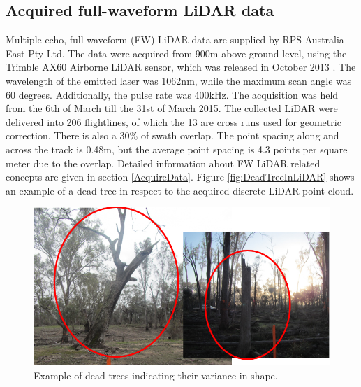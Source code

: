 \documentclass{subfiles}
\begin{document}
\subsection{Acquired full-waveform LiDAR data}

\par Multiple-echo, full-waveform (FW) LiDAR data are supplied by RPS Australia East Pty Ltd. The data were acquired from 900m above ground level, using the Trimble AX60 Airborne LiDAR sensor, which was released in October 2013 \cite{Trimble}. The wavelength of the emitted laser was 1062nm, while the maximum scan angle was 60 degrees. Additionally, the pulse rate was 400kHz. The acquisition was held from the 6th of March till the 31st of March 2015.  The collected LiDAR were delivered into 206 flightlines, of which the 13 are cross runs used for geometric correction. There is also a 30\% of swath overlap. The point spacing along and across the track  is 0.48m, but the average point spacing is 4.3 points per square meter due to the overlap. Detailed information about FW LiDAR related concepts are given in section \ref{AcquireData}. Figure \ref{fig:DeadTreeInLiDAR} shows an example of a dead tree in respect to the acquired discrete LiDAR point cloud.  

	\begin{figure} [h!]
		\centering
		\includegraphics[width=\textwidth]{img/DeadTreesExamplePhotos}
		\caption{Example of dead trees indicating their variance in shape.}
		\label{fig:DeadTreesExamplePhotos}
	\end{figure}
\end{document}
